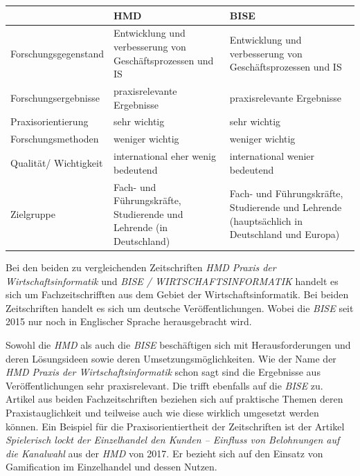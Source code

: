 \documentclass[12pt,utf8]{scrartcl}
\begin{document}
\begin{flushleft}
\begin{tabular}{|p{4cm}|p{5.5cm}|p{5.5cm}|}
\hline
& HMD & BISE \\
\hline
Forschungsgegenstand & Entwicklung und verbesserung von Geschäftsprozessen und IS & Entwicklung und verbesserung von Geschäftsprozessen und IS \\
\hline
Forschungsergebnisse & praxisrelevante Ergebnisse & praxisrelevante Ergebnisse \\
\hline
Praxisorientierung & sehr wichtig & sehr wichtig \\
\hline
Forschungsmethoden & weniger wichtig & weniger wichtig \\
\hline
Qualität/ Wichtigkeit & international eher wenig bedeutend & international wenier bedeutend \\
\hline
Zielgruppe & Fach- und Führungskräfte, Studierende und Lehrende (in Deutschland) & Fach- und Führungskräfte, Studierende und Lehrende (hauptsächlich in Deutschland und Europa) \\
\hline
\end{tabular}
\newline
\newline
\newline

Bei den beiden zu vergleichenden Zeitschriften \emph{HMD Praxis der Wirtschaftsinformatik} und \emph{BISE / WIRTSCHAFTSINFORMATIK} handelt es sich um Fachzeitschrifften aus dem Gebiet der Wirtschaftsinformatik. Bei beiden Zeitschriften handelt es sich um deutsche Veröffentlichungen. Wobei die \emph{BISE} seit 2015 nur noch in Englischer Sprache herausgebracht wird\cite{BISE}.

Sowohl die \emph{HMD} als auch die \emph{BISE} beschäftigen sich mit Herausforderungen und deren Lösungsideen sowie deren Umsetzungsmöglichkeiten\cite{Meier2017}\cite{Stein2017}\cite{Ebert2017}. Wie der Name der \emph{HMD Praxis der Wirtschaftsinformatik} schon sagt sind die Ergebnisse aus Veröffentlichungen sehr praxisrelevant. Die trifft ebenfalls auf die \emph{BISE} zu. Artikel aus beiden Fachzeitschriften beziehen sich auf praktische Themen deren Praxistauglichkeit und teilweise auch wie diese wirklich umgesetzt werden können\cite{Meier2017}\cite{Stein2017}\cite{Ebert2017}\cite{Kakar2017}. Ein Beispiel für die Praxisorientiertheit der Zeitschriften ist der Artikel \emph{Spielerisch lockt der Einzelhandel den Kunden – Einfluss von Belohnungen auf die Kanalwahl}\cite{Stein2017} aus der \emph{HMD} von 2017. Er bezieht sich auf den Einsatz von Gamification im Einzelhandel und dessen Nutzen. 


\end{flushleft}
\end{document}
